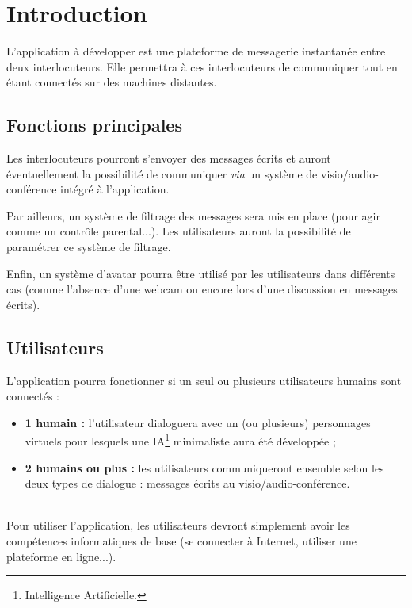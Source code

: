 \documentclass[11pt,dvipsnames,svgnames]{report}
\begin{document}
\newpage
\tableofcontents

\newpage


\chapter{Introduction}

L'application à développer est une plateforme de messagerie instantanée entre deux interlocuteurs. Elle permettra à ces interlocuteurs de communiquer tout en étant connectés sur des machines distantes. 

\section{Fonctions principales}
Les interlocuteurs pourront s'envoyer des messages écrits et auront éventuellement la possibilité de communiquer \emph{via} un système de visio/audio-conférence intégré à l'application. 

Par ailleurs, un système de filtrage des messages sera mis en place (pour agir comme un contrôle parental...). Les utilisateurs auront la possibilité de paramétrer ce système de filtrage.

Enfin, un système d'avatar pourra être utilisé par les utilisateurs dans différents cas (comme l'absence d'une webcam ou encore lors d'une discussion en messages écrits).

\section{Utilisateurs}
L'application pourra fonctionner si un seul ou plusieurs utilisateurs humains sont connectés :
\begin{itemize}
\item \textbf{1 humain : } l'utilisateur dialoguera avec un (ou plusieurs) personnages virtuels pour lesquels une IA\footnote{Intelligence Artificielle.} minimaliste aura été développée ;
\item \textbf{2 humains ou plus : } les utilisateurs communiqueront ensemble selon les deux types de dialogue : messages écrits au visio/audio-conférence.

\end{itemize}

~\\\indent
Pour utiliser l'application, les utilisateurs devront simplement avoir les compétences informatiques de base (se connecter à Internet, utiliser une plateforme en ligne...).
\end{document}
